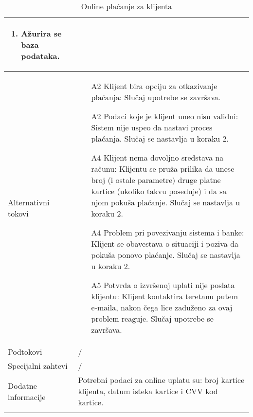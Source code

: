 \documentclass[../main.tex]{subfiles}
\begin{document}
\begin{longtable}{| p{} | p{} |}
\begin{enumerate}
        \item Ažurira se baza podataka.
    \end{enumerate}\\
\hline
    Alternativni tokovi & \begin{enumerate}
       		\item [A2] Klijent bira opciju za otkazivanje plaćanja: Slučaj upotrebe se završava.
        	\item [A2] Podaci koje je klijent uneo nisu validni: Sistem nije uspeo da nastavi proces plaćanja. Slučaj se nastavlja u koraku 2.
        	\item [A4] Klijent nema dovoljno sredstava na računu: Klijentu se pruža prilika da unese broj (i ostale parametre) druge platne kartice (ukoliko takvu poseduje) i da sa njom pokuša plaćanje. Slučaj se nastavlja u koraku 2. %
        	\item [A4] Problem pri povezivanju sistema i banke: Klijent se obavestava o situaciji i poziva da pokuša ponovo plaćanje. Slučaj se nastavlja u koraku 2.
        	\item [A5] Potvrda o izvršenoj uplati nije poslata klijentu: Klijent kontaktira teretanu putem e-maila, nakon čega lice zaduženo za ovaj problem reaguje. Slučaj upotrebe se završava.
        	\end{enumerate}\\
\hline
    Podtokovi & / \\
\hline
    Specijalni zahtevi & / \\
\hline
    Dodatne informacije & Potrebni podaci za online uplatu su: broj kartice klijenta, datum isteka kartice i CVV kod kartice. \\
\hline
\caption{Online plaćanje za klijenta} %
\label{tab:myfirstlongtable}
\end{longtable}

\end{document}
